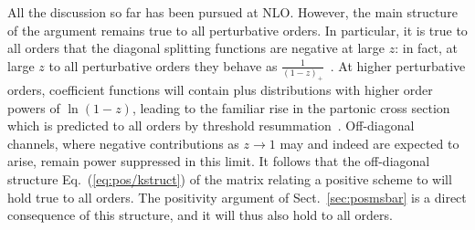 All the discussion so far has been pursued at NLO\@. However, the main
structure of the argument remains true to all perturbative orders. In
particular,  it is true to all orders that the diagonal splitting
functions are negative at large $z$: in fact, at large $z$ to all
perturbative orders they behave as $\frac{1}{(1-z)_+}$~\cite{Albino:2000cp}. At higher
perturbative orders, coefficient functions will contain plus distributions with higher order
powers of $\ln(1-z)$, leading to  the familiar rise in the partonic
cross section which is predicted to all orders by threshold
resummation~\cite{Catani:1989ne,Sterman:1986aj}. Off-diagonal
channels, where negative contributions as $z\to1$ may and indeed are
expected to arise, 
remain power suppressed in this limit. It follows that the
off-diagonal structure Eq.~(\ref{eq:pos/kstruct})
of the matrix relating a positive scheme to \msbar{} will hold true to
all orders. The positivity argument of Sect.~\ref{sec:posmsbar} is a
direct consequence of this structure, and it will thus also hold to
all orders.

